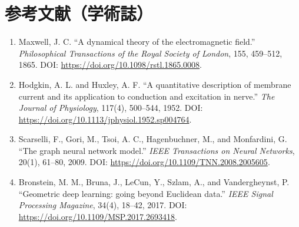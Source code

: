 \section*{参考文献（学術誌）}
\begin{enumerate}[leftmargin=2.4em]
\item Maxwell, J. C. ``A dynamical theory of the electromagnetic field.'' \textit{Philosophical Transactions of the Royal Society of London}, 155, 459--512, 1865. DOI: \url{https://doi.org/10.1098/rstl.1865.0008}.
\item Hodgkin, A. L. and Huxley, A. F. ``A quantitative description of membrane current and its application to conduction and excitation in nerve.'' \textit{The Journal of Physiology}, 117(4), 500--544, 1952. DOI: \url{https://doi.org/10.1113/jphysiol.1952.sp004764}.
\item Scarselli, F., Gori, M., Tsoi, A. C., Hagenbuchner, M., and Monfardini, G. ``The graph neural network model.'' \textit{IEEE Transactions on Neural Networks}, 20(1), 61--80, 2009. DOI: \url{https://doi.org/10.1109/TNN.2008.2005605}.
\item Bronstein, M. M., Bruna, J., LeCun, Y., Szlam, A., and Vandergheynst, P. ``Geometric deep learning: going beyond Euclidean data.'' \textit{IEEE Signal Processing Magazine}, 34(4), 18--42, 2017. DOI: \url{https://doi.org/10.1109/MSP.2017.2693418}.
\end{enumerate}

